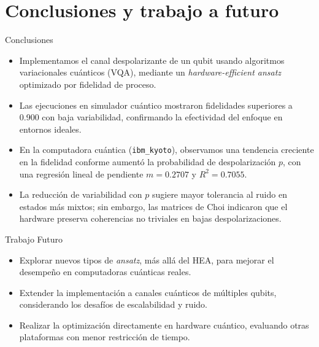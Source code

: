 \documentclass[aspectratio=169,xcolor=dvipsnames]{beamer}
\begin{document}
\section{Conclusiones y trabajo a futuro}



\begin{frame}{Conclusiones}
\begin{itemize}
    \item Implementamos el canal despolarizante de un qubit usando algoritmos variacionales cuánticos (VQA), mediante un \textit{hardware-efficient ansatz} optimizado por fidelidad de proceso.
    
    \item Las ejecuciones en simulador cuántico mostraron fidelidades superiores a 0.900 con baja variabilidad, confirmando la efectividad del enfoque en entornos ideales.
    
    \item En la computadora cuántica (\texttt{ibm\_kyoto}), observamos una tendencia creciente en la fidelidad conforme aumentó la probabilidad de despolarización $p$, con una regresión lineal de pendiente $m = 0.2707$ y $R^2 = 0.7055$.
    
    \item La reducción de variabilidad con $p$ sugiere mayor tolerancia al ruido en estados más mixtos; sin embargo, las matrices de Choi indicaron que el hardware preserva coherencias no triviales en bajas despolarizaciones.
    
\end{itemize}
\end{frame}

\begin{frame}{Trabajo Futuro}
\begin{itemize}
\item Explorar nuevos tipos de \textit{ansatz}, más allá del HEA, para mejorar el desempeño en computadoras cuánticas reales.

\item Extender la implementación a canales cuánticos de múltiples qubits, considerando los desafíos de escalabilidad y ruido.

\item Realizar la optimización directamente en hardware cuántico, evaluando otras plataformas con menor restricción de tiempo.
\end{itemize}
    
\end{frame}


%     
%     

\end{document}
